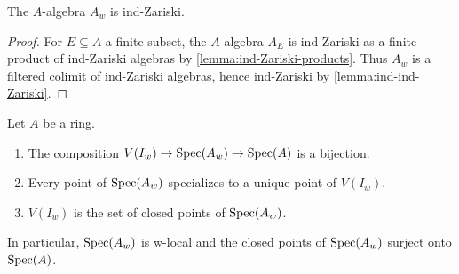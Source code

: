 \begin{lemma}
    The $A$-algebra $A_{w}$ is ind-Zariski.
    \label{lemma:w-localization-ind-Zariski}
\end{lemma}

\begin{proof}
    For $E \subseteq A$ a finite subset, the $A$-algebra $A_E$ is ind-Zariski
    as a finite product of ind-Zariski algebras by \ref{lemma:ind-Zariski-products}.
    Thus $A_w$ is a filtered colimit of ind-Zariski algebras, hence ind-Zariski
    by \ref{lemma:ind-ind-Zariski}.
\end{proof}

\begin{lemma}
    \label{lemma:w-localization-closed-points}
    Let $A$ be a ring.
    \begin{enumerate}
        \item The composition $V(I_w) \to \mathrm{Spec}(A_w) \to \mathrm{Spec}(A)$ is a bijection.
            \label{item:w-localization-bijection}
        \item Every point of $\mathrm{Spec}(A_w)$ specializes to a unique point of $V(I_w)$.
        \item $V(I_w)$ is the set of closed points of $\mathrm{Spec}(A_w)$.
    \end{enumerate}
    In particular, $\mathrm{Spec}(A_w)$ is w-local and the closed points of $\mathrm{Spec}(A_w)$ surject onto $\mathrm{Spec}(A)$.
\end{lemma}

